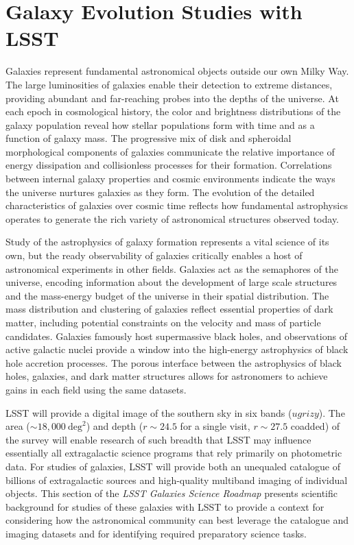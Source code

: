 
\chapter[Galaxy Evolution Studies with LSST]{Galaxy Evolution Studies with LSST}
\label{ch:science_background}
{\justify


Galaxies represent fundamental astronomical objects
outside our own Milky Way. 
The large luminosities of galaxies enable their 
detection to extreme distances, providing abundant
and far-reaching probes into the depths of the universe.
At each epoch in cosmological history, the color
and brightness distributions of the galaxy population
reveal how stellar populations form with time and
as a function of galaxy mass. The progressive mix of
disk and spheroidal morphological components of 
galaxies communicate the relative importance of
energy dissipation and collisionless processes
for their formation.
Correlations between internal galaxy properties and
cosmic environments indicate
the ways the universe nurtures galaxies as they form.
The evolution of the
detailed characteristics of galaxies over cosmic time
reflects how fundamental astrophysics
operates to generate the rich variety of 
astronomical structures observed today.

Study of the astrophysics of galaxy formation represents
a vital science of its own, but the ready
observability of galaxies critically enables a host of
astronomical experiments in other fields. 
Galaxies act as the semaphores of the
universe, encoding information about
the development of large scale
structures and the mass-energy budget of the
universe in their spatial distribution. The mass distribution
and clustering of galaxies reflect essential
properties of dark matter, including potential
constraints on the velocity and mass of particle candidates.
Galaxies famously host supermassive black holes, 
and observations of active galactic nuclei provide
a window into the high-energy astrophysics of black hole
accretion processes. The porous interface between the
astrophysics of black holes, galaxies, and 
dark matter structures allows for astronomers to 
achieve gains in each field using the same datasets.

LSST will provide a 
digital image of the southern sky in six bands ($ugrizy$).
The area ($\sim18,000~\mathrm{deg}^2$) and depth 
($r\sim24.5$ for a single visit, $r\sim27.5$ coadded) of
the survey will enable research of such breadth
that LSST may influence essentially all extragalactic 
science programs that rely primarily on photometric data.
For studies of galaxies, LSST will provide both an unequaled 
catalogue of billions of extragalactic sources and high-quality 
multiband imaging of individual objects. This section of
the {\it LSST Galaxies Science Roadmap} presents scientific
background for studies of these galaxies with LSST to provide a
context for considering how the astronomical community can
best leverage the catalogue and imaging datasets and for
identifying required preparatory science tasks.

}
